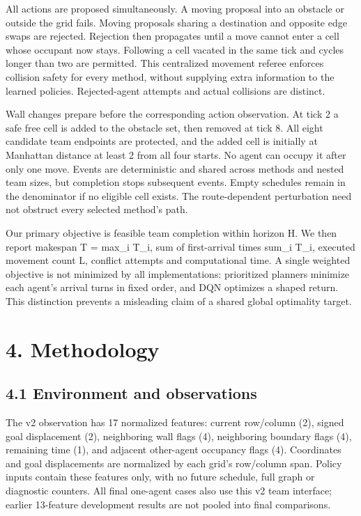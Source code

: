 \documentclass[10pt,a4paper]{article}
\begin{document}
All actions are proposed simultaneously. A moving proposal into an obstacle or
outside the grid fails. Moving proposals sharing a destination and opposite
edge swaps are rejected. Rejection then propagates until a move cannot enter
a cell whose occupant now stays. Following a cell vacated in the same tick and
cycles longer than two are permitted. This centralized movement referee enforces
collision safety for every method, without supplying extra information to the
learned policies. Rejected-agent attempts and actual collisions are distinct.

Wall changes prepare before the corresponding action observation. At tick 2 a
safe free cell is added to the obstacle set, then removed at tick 8. All eight
candidate team endpoints are protected, and the added cell is initially at
Manhattan distance at least 2 from all four starts. No agent can occupy it after
only one move. Events are deterministic and shared across methods and nested
team sizes, but completion stops subsequent events. Empty schedules remain in
the denominator if no eligible cell exists. The route-dependent perturbation
need not obstruct every selected method's path.

Our primary objective is feasible team completion within horizon H. We then
report makespan T = max\_i T\_i, sum of first-arrival times sum\_i T\_i, executed
movement count L, conflict attempts and computational time. A single weighted
objective is not minimized by all implementations: prioritized planners minimize
each agent's arrival turns in fixed order, and DQN optimizes a shaped return.
This distinction prevents a misleading claim of a shared global optimality target.

\section*{4. Methodology}

\subsection*{4.1 Environment and observations}

The v2 observation has 17 normalized features: current row/column (2), signed
goal displacement (2), neighboring wall flags (4), neighboring boundary flags
(4), remaining time (1), and adjacent other-agent occupancy flags (4). Coordinates
and goal displacements are normalized by each grid's row/column span. Policy
inputs contain these features only, with no future schedule, full graph or
diagnostic counters. All final one-agent cases also use this v2 team interface;
earlier 13-feature development results are not pooled into final comparisons.
\end{document}
